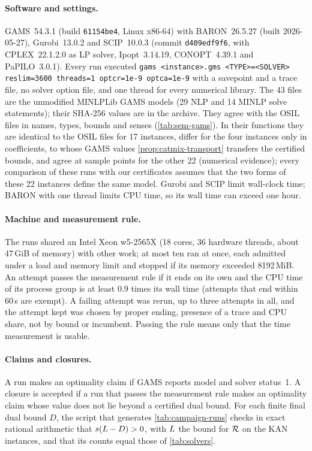 \paragraph{Software and settings.}
GAMS~54.3.1 (build \texttt{61154be4}, Linux x86-64) with BARON~26.5.27 (built 2026-05-27), Gurobi~13.0.2 and SCIP~10.0.3 (commit \texttt{d409edf9f6}, with CPLEX~22.1.2.0 as LP solver, Ipopt~3.14.19, CONOPT~4.39.1 and PaPILO~3.0.1).
Every run executed \texttt{gams <instance>.gms <TYPE>=<SOLVER> reslim=3600 threads=1 optcr=1e-9 optca=1e-9} with a savepoint and a trace file, no solver option file, and one thread for every numerical library.
The 43 files are the unmodified MINLPLib GAMS models (29 NLP and 14 MINLP solve statements); their SHA-256 values are in the archive.
They agree with the OSIL files in names, types, bounds and senses (\cref{tab:sem-gams}).
In their functions they are identical to the OSIL files for 17 instances, differ for the four  instances only in coefficients, to whose GAMS values \cref{prop:catmix-transport} transfers the certified bounds, and agree at sample points for the other 22 (numerical evidence); every comparison of these runs with our certificates assumes that the two forms of these 22 instances define the same model.
Gurobi and SCIP limit wall-clock time; BARON with one thread limits CPU time, so its wall time can exceed one hour.

\paragraph{Machine and measurement rule.}
The runs shared an Intel Xeon w5-2565X (18 cores, 36 hardware threads, about 47\,GiB of memory) with other work; at most ten ran at once, each admitted under a load and memory limit and stopped if its memory exceeded 8192\,MiB.
An attempt passes the measurement rule if it ends on its own and the CPU time of its process group is at least 0.9 times its wall time (attempts that end within 60\,s are exempt).
A failing attempt was rerun, up to three attempts in all, and the attempt kept was chosen by proper ending, presence of a trace and CPU share, not by bound or incumbent.
Passing the rule means only that the time measurement is usable.

\paragraph{Claims and closures.}
A run makes an optimality claim if GAMS reports model and solver status~1.
A closure is accepted if a run that passes the measurement rule makes an optimality claim whose value does not lie beyond a certified dual bound.
For each finite final dual bound $D$, the script that generates \cref{tab:campaign-runs} checks in exact rational arithmetic that $s(L-D)>0$, with $L$ the bound for $\mathcal{R}$ on the KAN instances, and that its counts equal those of \cref{tab:solvers}.

